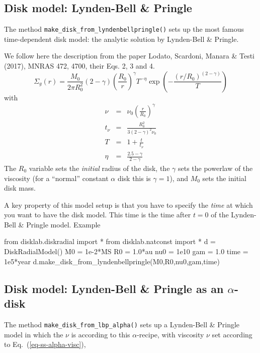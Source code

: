 \documentclass{book}
\newcommand{\code}[1]{{\small\tt #1}}
\begin{document}
\subsection{Disk model: Lynden-Bell \& Pringle}
The method \code{make\_disk\_from\_lyndenbellpringle()} sets up
the most famous time-dependent disk model: the analytic solution by
Lynden-Bell \& Pringle.

We follow here the description from the paper Lodato,
Scardoni, Manara \& Testi (2017), MNRAS 472, 4700, their Eqs. 2, 3 and 4.
\begin{equation}
\Sigma_g(r) = \frac{M_0}{2\pi R_0^2}(2-\gamma)\left(\frac{R_0}{r}\right)^\gamma
T^{-\eta}\exp\left(-\frac{(r/R_0)^{(2-\gamma)}}{T}\right)
\end{equation}
with
\begin{eqnarray}
  \nu &=& \nu_0 \left(\frac{r}{R_0}\right)^\gamma\\
  t_\nu &=& \frac{R_0^2}{3(2-\gamma)^2\nu_0}\\
  T &=& 1+\frac{t}{t_\nu}\\
  \eta &=& \frac{2.5-\gamma}{2-\gamma}
\end{eqnarray}
The $R_0$ variable sets the {\em initial} radius of the disk, the $\gamma$ sets
the powerlaw of the viscosity (for a ``normal'' constant $\alpha$ disk this is
$\gamma=1$), and $M_0$ sets the initial disk mass.

A key property of this model setup is that you have to specify the {\em time}
at which you want to have the disk model. This time is the time after $t=0$ of
the Lynden-Bell \& Pringle model. Example
\begin{codebox}
from disklab.diskradial import *
from disklab.natconst import *
d    = DiskRadialModel()
M0   = 1e-2*MS
R0   = 1.0*au
nu0  = 1e10
gam  = 1.0
time = 1e5*year
d.make_disk_from_lyndenbellpringle(M0,R0,nu0,gam,time)
\end{codebox}

\subsection{Disk model: Lynden-Bell \& Pringle as an $\alpha$-disk}
\label{sec-standard-model-lbp-as-alpha}
The method \code{make\_disk\_from\_lbp\_alpha()} sets up a Lynden-Bell \&
Pringle model in which the $\nu$ is according to this $\alpha$-recipe, with
viscosity $\nu$ set according to Eq.~(\ref{eq-ss-alpha-visc}),
\end{document}
